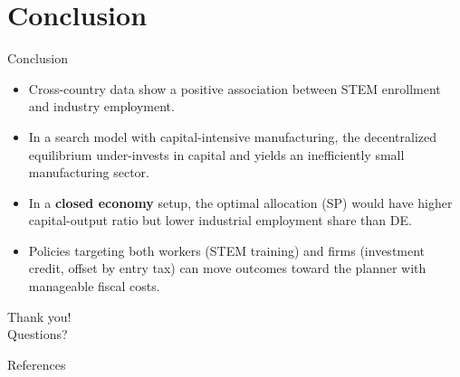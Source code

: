 \documentclass[9pt,xcolor={svgnames}]{beamer}
\begin{document}
\section{Conclusion}
\begin{frame}{Conclusion}
\small
\begin{itemize}

\item Cross-country data show a positive association between STEM enrollment and industry employment.

\medskip


 \item In a search model with capital-intensive manufacturing, the decentralized equilibrium under-invests in capital and yields an inefficiently small manufacturing sector.


\medskip
 \item  In a \textbf{closed economy} setup, the optimal allocation (SP) would have higher capital-output ratio but lower industrial employment share than DE. 


 \medskip

 \item Policies targeting both workers (STEM training) and firms (investment credit, offset by entry tax) can move outcomes toward the planner with manageable fiscal costs.
\end{itemize}
\end{frame}


\begin{frame}
  \centering
  \huge Thank you! \\
  \vspace{1em}
  \normalsize Questions?
\end{frame}

\begin{frame}{References}
  
\end{frame}
\end{document}
